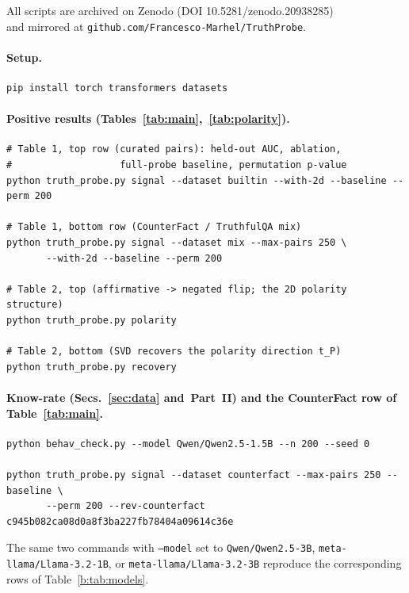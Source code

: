 \documentclass[11pt]{article}
\begin{document}
All scripts are archived on Zenodo (DOI 10.5281/zenodo.20938285) \\ and  mirrored
at \texttt{github.com/Francesco-Marhel/TruthProbe}.

\paragraph{Setup.}
\begin{verbatim}
pip install torch transformers datasets
\end{verbatim}

\paragraph{Positive results (Tables~\ref{tab:main},~\ref{tab:polarity}).}
\begin{verbatim}
# Table 1, top row (curated pairs): held-out AUC, ablation,
#                   full-probe baseline, permutation p-value
python truth_probe.py signal --dataset builtin --with-2d --baseline --perm 200

# Table 1, bottom row (CounterFact / TruthfulQA mix)
python truth_probe.py signal --dataset mix --max-pairs 250 \
       --with-2d --baseline --perm 200

# Table 2, top (affirmative -> negated flip; the 2D polarity structure)
python truth_probe.py polarity

# Table 2, bottom (SVD recovers the polarity direction t_P)
python truth_probe.py recovery
\end{verbatim}

\paragraph{Know-rate (Secs.~\ref{sec:data} and~Part~II) and the CounterFact row of Table~\ref{tab:main}.}
\begin{verbatim}
python behav_check.py --model Qwen/Qwen2.5-1.5B --n 200 --seed 0

python truth_probe.py signal --dataset counterfact --max-pairs 250 --baseline \
       --perm 200 --rev-counterfact c945b082ca08d0a8f3ba227fb78404a09614c36e
\end{verbatim}
The same two commands with \texttt{--model} set to \texttt{Qwen/Qwen2.5-3B},
\texttt{meta-llama/Llama-3.2-1B}, or \texttt{meta-llama/Llama-3.2-3B}
reproduce the corresponding rows of Table~\ref{b:tab:models}.
\end{document}
